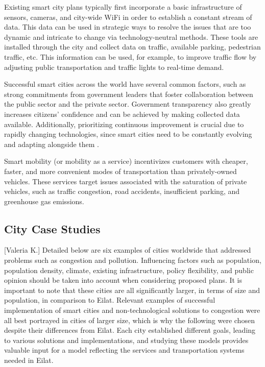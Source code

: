 \documentclass[12pt]{article}                               %
\begin{document}
Existing smart city plans typically first incorporate a basic infrastructure of sensors, cameras, and city-wide WiFi in order to establish a constant stream of data. This data can be used in strategic ways to resolve the issues that are too dynamic and intricate to change via technology-neutral methods. These tools are installed through the city and collect data on traffic, available parking, pedestrian traffic, etc. This information can be used, for example, to improve traffic flow by adjusting public transportation and traffic lights to real-time demand.

Successful smart cities across the world have several common factors, such as strong commitments from government leaders that foster collaboration between the public sector and the private sector. Government transparency also greatly increases citizens' confidence and can be achieved by making collected data available. Additionally, prioritizing continuous improvement is crucial due to rapidly changing technologies, since smart cities need to be constantly evolving and adapting alongside them \cite{Zanghi2017WhyExamples}. 

Smart mobility (or mobility as a service) incentivizes customers with cheaper, faster, and more convenient modes of transportation than privately-owned vehicles. These services target issues associated with the saturation of private vehicles, such as traffic congestion, road accidents, insufficient parking, and greenhouse gas emissions.

\subsection{City Case Studies}[Valeria K.]
Detailed below are six examples of cities worldwide that addressed problems such as congestion and pollution. Influencing factors such as population, population density, climate, existing infrastructure, policy flexibility, and public opinion should be taken into account when considering proposed plans. It is important to note that these cities are all significantly larger, in terms of size and population, in comparison to Eilat. Relevant examples of successful implementation of smart cities and non-technological solutions to congestion were all best portrayed in cities of larger size, which is why the following were chosen despite their differences from Eilat. Each city established different goals, leading to various solutions and implementations, and studying these models provides valuable input for a model reflecting the services and transportation systems needed in Eilat.
\end{document}
